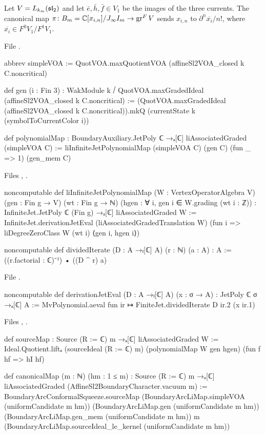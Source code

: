\begin{definition}\label{l20:def:canonical}
Let $V=L_{k_m}(\mathfrak{sl}_2)$ and let $\bar e,\bar h,\bar f\in V_1$ be the images of the three currents. The
canonical map $\pi\colon B_m={\mathbb{C}}[x_{i,n}]/J_\infty I_m\to\operatorname{gr}^F V$ sends $x_{i,n}$ to
$\partial^n\overline{x_i}/n!$, where $\overline{x_i}\in F^0V_1/F^1V_1$.
\end{definition}
\noindent File .
\begin{leancode}
abbrev simpleVOA := QuotVOA.maxQuotientVOA (affineSl2VOA_closed k C.noncritical)

def gen (i : Fin 3) : WakModule k ⧸ QuotVOA.maxGradedIdeal (affineSl2VOA_closed k C.noncritical) :=
  (QuotVOA.maxGradedIdeal (affineSl2VOA_closed k C.noncritical)).mkQ
    (currentState k (symbolToCurrentColor i))

def polynomialMap : BoundaryAuxiliary.JetPoly ℂ →ₐ[ℂ] liAssociatedGraded (simpleVOA C) :=
  liInfiniteJetPolynomialMap (simpleVOA C) (gen C) (fun _ => 1) (gen_mem C)
\end{leancode}
\noindent Files ,
.
\begin{leancode}
noncomputable def liInfiniteJetPolynomialMap
    (W : VertexOperatorAlgebra V)
    (gen : Fin g → V) (wt : Fin g → ℕ)
    (hgen : ∀ i, gen i ∈ W.grading (wt i : ℤ)) :
    InfiniteJet.JetPoly ℂ (Fin g) →ₐ[ℂ] liAssociatedGraded W :=
  InfiniteJet.derivationJetEval (liAssociatedGradedTranslation W)
    (fun i => liDegreeZeroClass W (wt i) ⟨gen i, hgen i⟩)

noncomputable def dividedIterate (D : A →ₗ[ℂ] A) (r : ℕ) (a : A) : A :=
  ((r.factorial : ℂ)⁻¹) • ((D ^ r) a)
\end{leancode}
\noindent File .
\begin{leancode}
noncomputable def derivationJetEval (D : A →ₗ[ℂ] A) (x : σ → A) :
    JetPoly ℂ σ →ₐ[ℂ] A :=
  MvPolynomial.aeval fun ir ↦ FiniteJet.dividedIterate D ir.2 (x ir.1)
\end{leancode}
\noindent Files ,
.
\begin{leancode}
def sourceMap : Source (R := ℂ) m →ₐ[ℂ] liAssociatedGraded W :=
  Ideal.Quotient.liftₐ (sourceIdeal (R := ℂ) m) (polynomialMap W gen hgen)
    (fun f hf => hI hf)

def canonicalMap (m : ℕ) (hm : 1 ≤ m) :
    Source (R := ℂ) m →ₐ[ℂ] liAssociatedGraded (AffineSl2BoundaryCharacter.vacuum m) :=
  BoundaryArcConformalSqueeze.sourceMap
    (BoundaryArcLiMap.simpleVOA (uniformCandidate m hm))
    (BoundaryArcLiMap.gen (uniformCandidate m hm))
    (BoundaryArcLiMap.gen_mem (uniformCandidate m hm)) m
    (BoundaryArcLiMap.sourceIdeal_le_kernel (uniformCandidate m hm))
\end{leancode}
